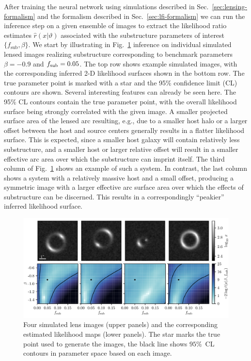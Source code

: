 \documentclass[twocolumn]{aastex62}
\begin{document}
After training the neural network using simulations described in Sec.~\ref{sec:lensing-formalism} and the formalism described in Sec.~\ref{sec:lfi-formalism} we can run the inference step on a given ensemble of images to extract the likelihood ratio estimates $\hat r(x | \vartheta)$ associated with the substructure parameters of interest $\{f_\mathrm{sub}, \beta\}$. We start by illustrating in Fig.~\ref{fig:individual_predictions} inference on individual simulated lensed images realizing substructure corresponding to benchmark parameters $\beta = -0.9$ and $f_{\mathrm{sub}} = 0.05$. The top row shows example simulated images, with the corresponding inferred 2-D likelihood surfaces shown in the bottom row. The true parameter point is marked with a star and the 95\% confidence limit (CL) contours are shown. Several interesting features can already be seen here. The 95\% CL contours contain the true parameter point, with the overall likelihood surface being strongly correlated with the given image. A smaller projected surface area of the lensed arc resulting, e.g., due to a smaller host halo or a larger offset between the host and source centers generally results in a flatter likelihood surface. This is expected, since a smaller host galaxy will contain relatively less substructure, and a smaller host or larger relative offset will result in a smaller effective arc area over which the substructure can imprint itself. The third column of Fig.~\ref{fig:individual_predictions} shows an example of such a system. In contrast, the last column shows a system with a relatively massive host and a small offset, producing a symmetric image with a larger effective arc surface area over which the effects of substructure can be discerned. This results in a correspondingly ``peakier'' inferred likelihood surface.

\begin{figure}
\centering
\includegraphics[width=1.\textwidth]{figures/individual_lens_predictions}
\caption{Four simulated lens images (upper panels) and the corresponding estimated likelihood maps (lower panels). The star marks the true point used to generate the images, the black line shows $95 \%$~CL contours in parameter space based on each image. }
\label{fig:individual_predictions}
\end{figure}
\end{document}
